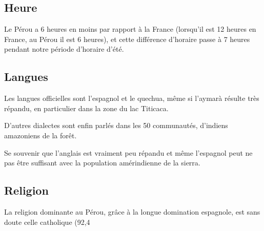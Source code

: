 \begin{multicols}{2}
\subsection{Heure}

Le Pérou a 6 heures en moins par rapport à la France (lorsqu'il est 12 heures en France, au Pérou il est 6 heures), et cette différence d'horaire passe à 7 heures pendant notre période d'horaire d'été.

\subsection{Langues}

Les langues officielles sont l'espagnol et le quechua, même si l'aymarà résulte très répandu, en particulier dans la zone du lac Titicaca.

D'autres dialectes sont enfin parlés dans les 50 communautés, d'indiens amazoniens de la forêt.

Se souvenir que l'anglais est vraiment peu répandu et même l'espagnol peut ne pas être suffisant avec la population amérindienne de la sierra.

\subsection{Religion}

La religion dominante au Pérou, grâce à la longue domination espagnole, est sans doute celle catholique (92,4%

\end{multicols}


